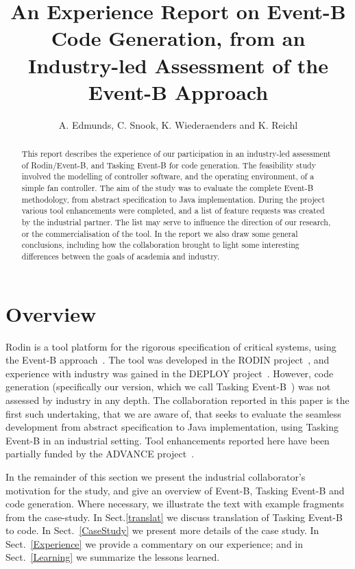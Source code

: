\documentclass{llncs}%
\begin{document}
%
\title{An Experience Report on Event-B Code Generation, from an Industry-led Assessment of the Event-B Approach }
\author{A. Edmunds, C. Snook, K. Wiederaenders and K. Reichl}



\maketitle
%
\begin{abstract}
This report describes the experience of our participation in an industry-led assessment of Rodin/Event-B, and Tasking Event-B for code generation. The feasibility study involved the modelling of controller software, and the operating environment, of a simple fan controller. The aim of the study was to evaluate the complete Event-B methodology, from abstract specification to Java implementation. During the project various tool enhancements were completed, and a list of feature requests was created by the industrial partner. The list may serve to influence the direction of our research, or the commercialisation of the tool. In the report we also draw some general conclusions, including how the collaboration brought to light some interesting differences between the goals of academia and industry. 
 \end{abstract}
%
%
\section{Overview}
Rodin is a  tool platform for the rigorous specification of critical systems, using the Event-B approach~\cite{ABR10}. The tool was developed in the RODIN project~\cite{RodinTool}, and experience with industry was gained in the DEPLOY project~\cite{DEPLOY}. However, code generation (specifically our version, which we call Tasking Event-B~\cite{ae2011a}) was not assessed by industry in any depth. The collaboration reported in this paper is the first such undertaking, that we are aware of, that seeks to evaluate the seamless development from abstract specification to Java implementation, using Tasking Event-B in an industrial setting. Tool enhancements reported here have been partially funded by the ADVANCE project~\cite{advance}.

In the remainder of this section we present the industrial collaborator's motivation for the study, and give an overview of Event-B, Tasking Event-B and code generation. Where necessary, we illustrate the text with example fragments from the case-study. In Sect.\ref{translat} we discuss translation of Tasking Event-B to code. In Sect.~\ref{CaseStudy} we present more details of the case study. In Sect.~\ref{Experience} we provide a commentary on our experience; and in Sect.~\ref{Learning} we summarize the lessons learned.
%
\end{document}
